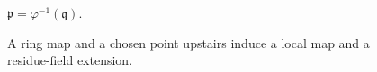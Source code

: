 \begin{figure}[htbp]
\centering
{}
\qquad $\mathfrak p=\varphi^{-1}(\mathfrak q)$.
\caption{A ring map and a chosen point upstairs induce a local map and a residue-field extension.}
\end{figure}
